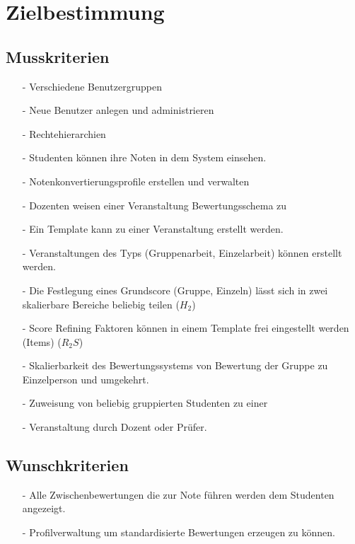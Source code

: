 


	
	\tableofcontents
	\newpage

	\section{Zielbestimmung}
		\subsection{Musskriterien}			

			
			\begin{itemize}
			\item[-]	Verschiedene Benutzergruppen
			\item[-]	Neue Benutzer anlegen und administrieren 
			\item[-]	Rechtehierarchien
			\item[-]	Studenten können ihre Noten in dem System einsehen.
			\item[-]	Notenkonvertierungsprofile erstellen und verwalten
			\item[-]	Dozenten weisen einer Veranstaltung Bewertungsschema zu
			\item[-]	Ein Template kann zu einer Veranstaltung erstellt werden.
			\item[-]	Veranstaltungen des Typs (Gruppenarbeit, Einzelarbeit) können erstellt werden.
			\item[-]	Die Festlegung eines Grundscore (Gruppe, Einzeln) lässt sich in zwei skalierbare \newline Bereiche beliebig teilen ($H_2$)
			\item[-]	Score Refining Faktoren können in einem Template frei eingestellt werden (Items) ($R_2S$)
			\item[-]	Skalierbarkeit des Bewertungssystems von Bewertung der Gruppe zu Einzelperson und umgekehrt.
			\item[-]	Zuweisung von beliebig gruppierten Studenten zu einer \item[-]	Veranstaltung durch Dozent oder Prüfer.				
			\end{itemize}

			
		\subsection{Wunschkriterien}
		\begin{itemize}
		\item[-]	Alle Zwischenbewertungen die zur Note führen werden dem Studenten angezeigt.
		\item[-]	Profilverwaltung um standardisierte Bewertungen erzeugen zu können.
		\end{itemize}
		
